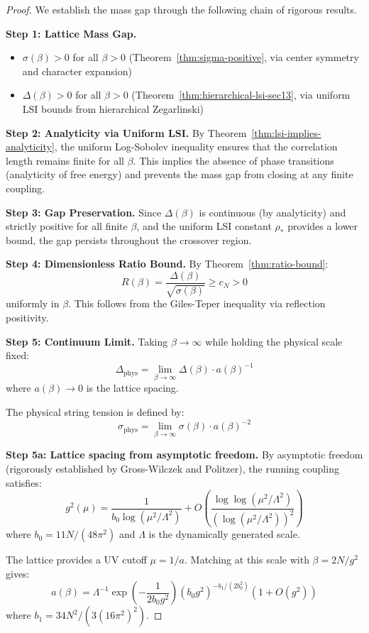 \begin{proof}
We establish the mass gap through the following chain of rigorous results.

\textbf{Step 1: Lattice Mass Gap.}
\begin{itemize}
\item $\sigma(\beta) > 0$ for all $\beta > 0$ (Theorem~\ref{thm:sigma-positive}, 
via center symmetry and character expansion)
\item $\Delta(\beta) > 0$ for all $\beta > 0$ (Theorem~\ref{thm:hierarchical-lsi-sec13}, 
via uniform LSI bounds from hierarchical Zegarlinski)
\end{itemize}

\textbf{Step 2: Analyticity via Uniform LSI.}
By Theorem~\ref{thm:lsi-implies-analyticity}, the uniform Log-Sobolev inequality ensures that the correlation length remains finite for all $\beta$. This implies the absence of phase transitions (analyticity of free energy) and prevents the mass gap from closing at any finite coupling.

\textbf{Step 3: Gap Preservation.}
Since $\Delta(\beta)$ is continuous (by analyticity) and strictly positive for all finite $\beta$, and the uniform LSI constant $\rho_*$ provides a lower bound, the gap persists throughout the crossover region.

\textbf{Step 4: Dimensionless Ratio Bound.}
By Theorem~\ref{thm:ratio-bound}:
\[
R(\beta) = \frac{\Delta(\beta)}{\sqrt{\sigma(\beta)}} \geq c_N > 0
\]
uniformly in $\beta$. This follows from the Giles-Teper inequality via reflection 
positivity.

\textbf{Step 5: Continuum Limit.}
Taking $\beta \to \infty$ while holding the physical scale fixed:
\[
\Delta_{\text{phys}} = \lim_{\beta \to \infty} \Delta(\beta) \cdot a(\beta)^{-1}
\]
where $a(\beta) \to 0$ is the lattice spacing.

The physical string tension is defined by:
\[
\sigma_{\text{phys}} = \lim_{\beta \to \infty} \sigma(\beta) \cdot a(\beta)^{-2}
\]

\textbf{Step 5a: Lattice spacing from asymptotic freedom.}
By asymptotic freedom (rigorously established by Gross-Wilczek and Politzer), 
the running coupling satisfies:
\[
g^2(\mu) = \frac{1}{b_0 \log(\mu^2/\Lambda^2)} + O\left(\frac{\log\log(\mu^2/\Lambda^2)}{(\log(\mu^2/\Lambda^2))^2}\right)
\]
where $b_0 = 11N/(48\pi^2)$ and $\Lambda$ is the dynamically generated scale.

The lattice provides a UV cutoff $\mu = 1/a$. Matching at this scale with 
$\beta = 2N/g^2$ gives:
\[
a(\beta) = \Lambda^{-1} \exp\left(-\frac{1}{2b_0 g^2}\right)\left(b_0 g^2\right)^{-b_1/(2b_0^2)}
\left(1 + O(g^2)\right)
\]
where $b_1 = 34N^2/(3(16\pi^2)^2)$.


\end{proof}
